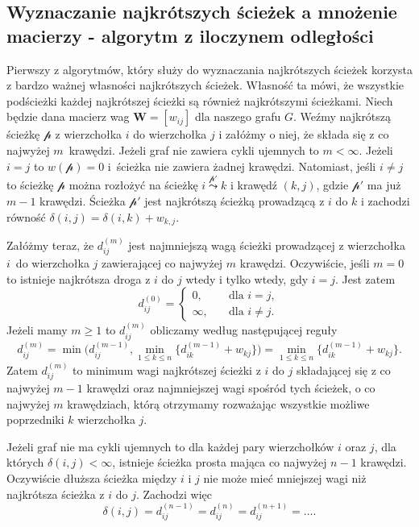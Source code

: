 \documentclass[12pt,a4paper]{book}
\theoremstyle{definition}
\newcommand{\p}{{\mathcal p}}
\numberwithin{equation}{chapter}
\begin{document}
\subsection{Wyznaczanie najkrótszych ścieżek a mnożenie macierzy - algorytm z iloczynem odległości}

Pierwszy z algorytmów, który służy do wyznaczania najkrótszych ścieżek korzysta z bardzo ważnej własności najkrótszych ścieżek. Własność ta mówi, że wszystkie podścieżki każdej najkrótszej ścieżki są również najkrótszymi ścieżkami. Niech  będzie dana macierz wag $\mathbf{W} = [w_{ij}]$ dla naszego grafu $G$. Weźmy najkrótszą ścieżkę $\p$ z wierzchołka $i$ do wierzchołka $j$ i załóżmy o niej, że składa się z co najwyżej $m$~krawędzi. Jeżeli graf nie zawiera cykli ujemnych to $m < \infty$. Jeżeli $i = j$ to $w(\p) = 0$ i~ścieżka nie zawiera żadnej krawędzi. Natomiast, jeśli $i \neq j$ to ścieżkę $\p$ można rozłożyć na ścieżkę $i\stackrel{\p'}{\leadsto}k$ i krawędź $(k,j)$, gdzie $\p'$ ma już $m-1$ krawędzi. Ścieżka $\p'$ jest najkrótszą ścieżką prowadzącą z $i$ do $k$ i zachodzi równość $\delta(i,j) = \delta(i,k) + w_{k,j}$.

Załóżmy teraz, że $d_{ij}^{(m)}$ jest najmniejszą wagą ścieżki prowadzącej z wierzchołka $i$~do wierzchołka $j$ zawierającej co najwyżej $m$ krawędzi. Oczywiście, jeśli $m=0$ to istnieje najkrótsza droga z $i$ do $j$ wtedy i tylko wtedy, gdy $i = j$. Jest zatem
$$
d_{ij}^{(0)}=\left\{
\begin{array}{ll}
0,&\quad \mbox{dla $i = j$},\\
\infty,&\quad \mbox{dla $i \neq j$}.
\end{array}\right.
$$
Jeżeli mamy $m \geq 1$ to $d_{ij}^{(m)}$ obliczamy według następującej reguły
\begin{equation}
\label{eq_1}
d_{i j}^{(m)} = \min\big(d_{i j}^{(m-1)}, \min_{1 \leq k \leq n}\{d_{i k}^{(m-1)} + w_{k j}\}\big)
= \min_{1 \leq k \leq n}\{d_{i k}^{(m-1)} + w_{k j}\}.
\end{equation}
Zatem $d_{i j}^{(m)}$ to minimum wagi najkrótszej ścieżki z $i$ do $j$ składającej się z co najwyżej $m-1$ krawędzi oraz najmniejszej wagi spośród tych ścieżek, o co najwyżej $m$ krawędziach, którą otrzymamy rozważając wszystkie możliwe poprzedniki $k$ wierzchołka $j$.

Jeżeli graf nie ma cykli ujemnych to dla każdej pary wierzchołków  $i$ oraz $j$, dla których $\delta(i,j) < \infty$, istnieje ścieżka prosta mająca co najwyżej $n-1$ krawędzi. Oczywiście dłuższa ścieżka między $i$ i $j$ nie może mieć mniejszej wagi niż najkrótsza ścieżka z $i$ do $j$. Zachodzi więc 
\begin{equation}
\label{eq_2}
\delta(i,j) = d_{ij}^{(n-1)} = d_{ij}^{(n)} = d_{ij}^{(n+1)} = \dots.
\end{equation}
\end{document}
